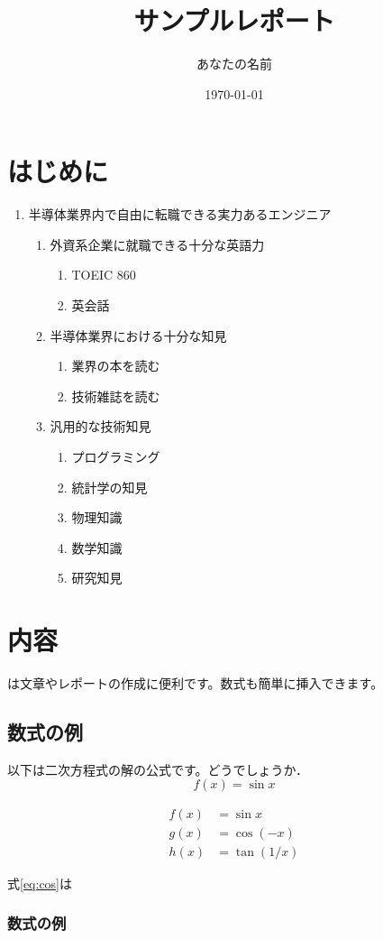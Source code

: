 \documentclass{article}
\title{サンプルレポート}
\author{あなたの名前}
\date{\today}
\begin{document}
\maketitle
\section{はじめに}
\begin{enumerate}
  \item 半導体業界内で自由に転職できる実力あるエンジニア
  \begin{enumerate}
    \item 外資系企業に就職できる十分な英語力
    \begin{enumerate}
      \item TOEIC 860
      \item 英会話
    \end{enumerate}
    \item 半導体業界における十分な知見
    \begin{enumerate}
      \item 業界の本を読む
      \item 技術雑誌を読む
    \end{enumerate}
    \item 汎用的な技術知見
    \begin{enumerate}
      \item プログラミング
      \item 統計学の知見
      \item 物理知識
      \item 数学知識
      \item 研究知見
    \end{enumerate}
  \end{enumerate}
\end{enumerate}
\section{内容}
は文章やレポートの作成に便利です。数式も簡単に挿入できます。
\subsection{数式の例}
以下は二次方程式の解の公式です。どうでしょうか．
\begin{equation} \label{eq:a}
  f(x) = \sin x
\end{equation}

\begin{align}
  f(x) &= \sin x  \\
  g(x) &= \cos (-x) \label{eq:cos} \\
  h(x) &= \tan(1/x)
\end{align}

式\eqref{eq:cos}は
\subsubsection{数式の例}
\end{document}
